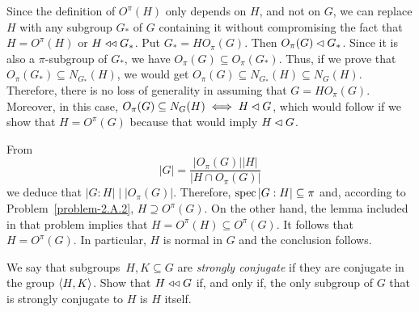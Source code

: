 \begin{solution} Since the definition of $O^\pi(H)$ only depends on $H$, and not on $G$, we can replace $H$ with any subgroup $G_*$ of $G$ containing it without compromising the fact that $H=O^\pi(H)$ or $H\mathrel{\triangleleft\triangleleft} G_*$. Put $G_*=HO_\pi(G)$. Then $O_\pi(G)\lhd G_*$. Since it is also a $\pi$-subgroup of $G_*$, we have $O_\pi(G)\subseteq O_\pi(G_*)$. Thus, if we prove that $O_\pi(G_*)\subseteq N_{G_*}(H)$, we would get $O_\pi(G)\subseteq N_{G_*}(H)\subseteq N_G(H)$. Therefore, there is no loss of generality in assuming that $G=HO_\pi(G)$. Moreover, in this case, $O_\pi(G)\subseteq N_G(H)\iff H\lhd G$, which would follow if we show that $H=O^\pi(G)$ because that would imply $H\lhd G$.

From
$$
    |G| = \frac{|O_\pi(G)||H|}{|H\cap O_\pi(G)|}
$$
we deduce that $|G:H|\mid|O_\pi(G)|$. Therefore, $\operatorname{spec}|G:H|\subseteq\pi$ and, according to Problem~\ref{problem-2.A.2}, $H\supseteq O^\pi(G)$. On the other hand, the lemma included in that problem implies that $H=O^\pi(H)\subseteq O^\pi(G)$. It follows that $H=O^\pi(G)$. In particular, $H$ is normal in $G$ and the conclusion follows.  \end{solution}

\begin{probl}
    We say that subgroups\ $H, K\subseteq G$ are \textsl{strongly conjugate} if they are conjugate in the group\/ $\langle H,K\rangle$. Show that\/ $H\mathrel{\triangleleft\triangleleft} G$ if, and only if, the only subgroup of\/ $G$ that is strongly conjugate to\/ $H$ is\/ $H$ itself.
\end{probl}

